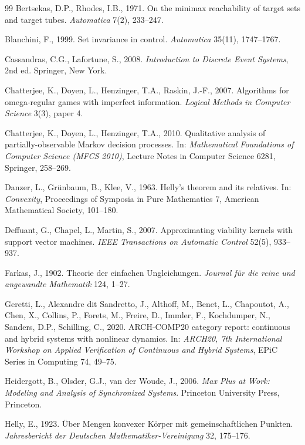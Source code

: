 \begin{thebibliography}{99}
 Bertsekas, D.P., Rhodes, I.B., 1971. On the minimax reachability of target sets and target tubes. \emph{Automatica} 7(2), 233--247.

 Blanchini, F., 1999. Set invariance in control. \emph{Automatica} 35(11), 1747--1767.

 Cassandras, C.G., Lafortune, S., 2008. \emph{Introduction to Discrete Event Systems}, 2nd ed. Springer, New York.

 Chatterjee, K., Doyen, L., Henzinger, T.A., Raskin, J.-F., 2007. Algorithms for omega-regular games with imperfect information. \emph{Logical Methods in Computer Science} 3(3), paper 4.

 Chatterjee, K., Doyen, L., Henzinger, T.A., 2010. Qualitative analysis of partially-observable Markov decision processes. In: \emph{Mathematical Foundations of Computer Science (MFCS 2010)}, Lecture Notes in Computer Science 6281, Springer, 258--269.

 Danzer, L., Gr\"unbaum, B., Klee, V., 1963. Helly's theorem and its relatives. In: \emph{Convexity}, Proceedings of Symposia in Pure Mathematics 7, American Mathematical Society, 101--180.

 Deffuant, G., Chapel, L., Martin, S., 2007. Approximating viability kernels with support vector machines. \emph{IEEE Transactions on Automatic Control} 52(5), 933--937.

 Farkas, J., 1902. Theorie der einfachen Ungleichungen. \emph{Journal f\"ur die reine und angewandte Mathematik} 124, 1--27.

 Geretti, L., Alexandre dit Sandretto, J., Althoff, M., Benet, L., Chapoutot, A., Chen, X., Collins, P., Forets, M., Freire, D., Immler, F., Kochdumper, N., Sanders, D.P., Schilling, C., 2020. ARCH-COMP20 category report: continuous and hybrid systems with nonlinear dynamics. In: \emph{ARCH20, 7th International Workshop on Applied Verification of Continuous and Hybrid Systems}, EPiC Series in Computing 74, 49--75.

 Heidergott, B., Olsder, G.J., van der Woude, J., 2006. \emph{Max Plus at Work: Modeling and Analysis of Synchronized Systems}. Princeton University Press, Princeton.

 Helly, E., 1923. \"Uber Mengen konvexer K\"orper mit gemeinschaftlichen Punkten. \emph{Jahresbericht der Deutschen Mathematiker-Vereinigung} 32, 175--176.


\end{thebibliography}
